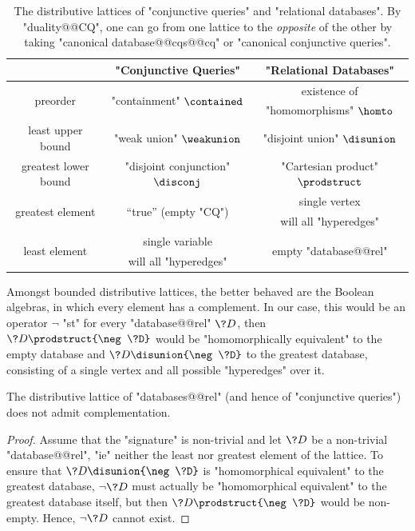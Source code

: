 \begin{table}
	\centering
	\begin{tabular}{ccc}
		\toprule
		 & "Conjunctive Queries" & "Relational Databases" \\ \midrule
		\multirow{2}{*}{preorder} & \multirow{2}{*}{"containment" $\contained$} & existence of\\
		& & "homomorphisms" $\homto$ \\
		least upper bound & "weak union" $\weakunion$ & "disjoint union" $\disunion$ \\
		greatest lower bound & "disjoint conjunction" $\disconj$ & "Cartesian product" $\prodstruct$ \\ 
		\multirow{2}{*}{greatest element} & \multirow{2}{*}{``true'' (empty "CQ")} & single vertex \\
		& & will all "hyperedges" \\
		\multirow{2}{*}{least element} & single variable & \multirow{2}{*}{empty "database@@rel"}
		\\
		& will all "hyperedges" & \\ \bottomrule
	\end{tabular}
	\caption{
		\AP\label{tab:distributive-lattices}
		The distributive lattices of "conjunctive queries" and "relational databases".
		By "duality@@CQ", one can go from one lattice to the \emph{opposite} of the other
		by taking "canonical database@@cqs@@cq" or "canonical conjunctive queries".}
\end{table}

Amongst bounded distributive lattices, the better behaved are
the Boolean algebras, in which every element has a complement.
In our case, this would be an operator $\neg$ "st" for every "database@@rel" $\?D$,
then $\?D \prodstruct {\neg \?D}$ would be "homomorphically equivalent" to
the empty database and $\?D \disunion {\neg \?D}$ to the greatest database,
consisting of a single vertex and all possible "hyperedges" over it.

\begin{proposition}
	The distributive lattice of "databases@@rel" (and hence of
	"conjunctive queries") does not admit complementation.
\end{proposition}

\begin{proof}
	Assume that the "signature" is non-trivial and let $\?D$ be a non-trivial "database@@rel",
	"ie" neither the least nor greatest element of the lattice.
	To ensure that $\?D \disunion {\neg \?D}$ is "homomorphical equivalent"
	to the greatest database, $\neg \?D$ must actually be "homomorphical equivalent" to 
	the greatest database itself,
	but then $\?D \prodstruct {\neg \?D}$ would be non-empty.
	Hence, $\neg \?D$ cannot exist.
\end{proof}

